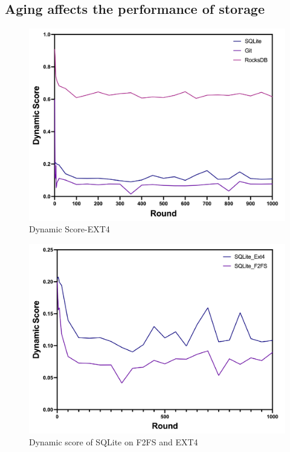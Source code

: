 





\subsection{Aging affects the performance of storage}

\begin{figure}[t]
    \centering
	\includegraphics[width=0.95\columnwidth]{graphs/ext4_dynamic}
	\caption{Dynamic Score-EXT4}
	\label{f:ext4_dynamic}
\end{figure}

\begin{figure}[t]
    \centering
	\includegraphics[width=0.95\columnwidth]{graphs/f2fs_vs_ext4_dynamic}
	\caption{Dynamic score of SQLite on F2FS and EXT4}
	\label{f:f2fs_vs_ext4_dynamic}
\end{figure}

